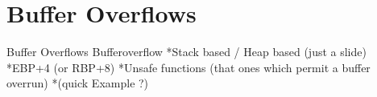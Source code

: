 \section{Buffer Overflows}
\begin{frame}{Buffer Overflows}
Bufferoverflow
*Stack based / Heap based (just a slide)
*EBP+4 (or RBP+8)
*Unsafe functions (that ones which permit a buffer overrun)
*(quick Example ?)
\end{frame}
